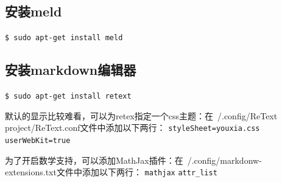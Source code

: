 \subsection{安装meld}
\verb"$ sudo apt-get install meld"

\subsection{安装markdown编辑器}
\verb"$ sudo apt-get install retext"

默认的显示比较难看，可以为retex指定一个css主题：在~/.config/ReText project/ReText.conf文件中添加以下两行：
\verb"styleSheet=youxia.css"
\verb"userWebKit=true"

为了开启数学支持，可以添加MathJax插件：在~/.config/markdonw-extensions.txt文件中添加以下两行：
\verb"mathjax"
\verb"attr_list"
